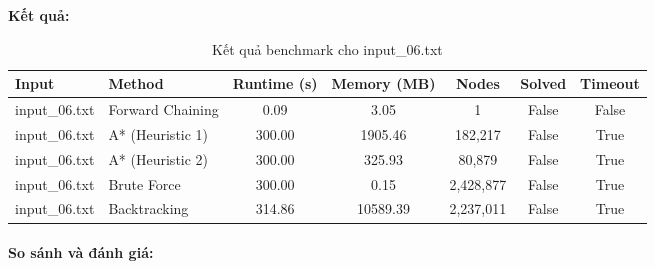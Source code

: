 \textbf{Kết quả:}
\begin{table}[H]
\centering
\begin{tabular}{|l|l|c|c|c|c|c|}
\hline
\textbf{Input} & \textbf{Method} & \textbf{Runtime (s)} & \textbf{Memory (MB)} & \textbf{Nodes} & \textbf{Solved} & \textbf{Timeout} \\
\hline
input\_06.txt & Forward Chaining & 0.09 & 3.05 & 1 & False & False \\
input\_06.txt & A* (Heuristic 1) & 300.00 & 1905.46 & 182,217 & False & True \\
input\_06.txt & A* (Heuristic 2) & 300.00 & 325.93 & 80,879 & False & True \\
input\_06.txt & Brute Force & 300.00 & 0.15 & 2,428,877 & False & True \\
input\_06.txt & Backtracking & 314.86 & 10589.39 & 2,237,011 & False & True \\
\hline
\end{tabular}
\caption{Kết quả benchmark cho input\_06.txt}
\end{table}

\paragraph{So sánh và đánh giá:}

